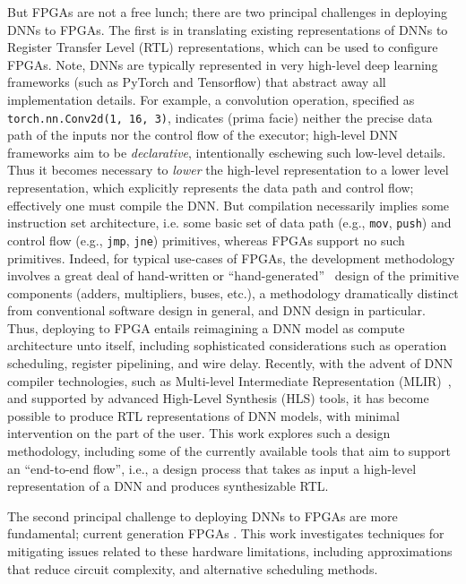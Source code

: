 But FPGAs are not a free lunch; there are two principal challenges in deploying DNNs to FPGAs.
The first is in translating existing representations of DNNs to Register Transfer Level (RTL) representations, which can be used to configure FPGAs.
Note, DNNs are typically represented in very high-level deep learning frameworks (such as PyTorch and Tensorflow) that abstract away all implementation details. 
For example, a convolution operation, specified as \texttt{torch.nn.Conv2d(1, 16, 3)}, indicates (prima facie) neither the precise data path of the inputs nor the control flow of the executor; high-level DNN frameworks aim to be \emph{declarative}, intentionally eschewing such low-level details.
Thus it becomes necessary to \emph{lower} the high-level representation to a lower level representation, which explicitly represents the data path and control flow; effectively one must compile the DNN.
But compilation necessarily implies some instruction set architecture, i.e. some basic set of data path (e.g., \texttt{mov}, \texttt{push}) and control flow (e.g., \texttt{jmp}, \texttt{jne}) primitives,
whereas FPGAs support no such primitives.
Indeed, for typical use-cases of FPGAs, the development methodology involves a great deal of hand-written or ``hand-generated''~\cite{nikhil2004bluespec} design of the primitive components (adders, multipliers, buses, etc.), a methodology dramatically distinct from conventional software design in general, and DNN design in particular.
Thus, deploying to FPGA entails reimagining a DNN model as compute architecture unto itself, including sophisticated considerations such as operation scheduling, register pipelining, and wire delay.
Recently, with the advent of DNN compiler technologies, such as Multi-level Intermediate Representation (MLIR)~\cite{https://doi.org/10.48550/arxiv.2002.11054}, and supported by advanced High-Level Synthesis (HLS) tools, it has become possible to produce RTL representations of DNN models, with minimal intervention on the part of the user.
This work explores such a design methodology, including some of the currently available tools that aim to support an ``end-to-end flow'', i.e., a design process that takes as input a high-level representation of a DNN and produces synthesizable RTL.

The second principal challenge to deploying DNNs to FPGAs are more fundamental; current generation FPGAs .
This work investigates techniques for mitigating issues related to these hardware limitations, including approximations that reduce circuit complexity, and alternative scheduling methods. 

